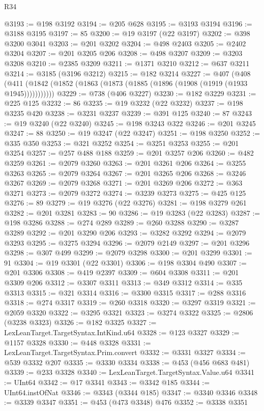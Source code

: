 \begin{lexlean}{R34}
\begin{coremodule}
@3193 := @198 @3192
@3194 := @205 @628
@3195 := @3193 @3194
@3196 := @3188 @3195
@3197 := 85
@3200 := @19 @3197 (@22 @3197)
@3202 := @398 @3200 @3041
@3203 := @201 @3202
@3204 := @498 @2403
@3205 := @2402 @3204
@3207 := @201 @3205 @206
@3208 := @498 @3207
@3209 := @3203 @3208
@3210 := @2385 @3209
@3211 := @1371 @3210
@3212 := @637 @3211
@3214 := @3185 (@3196 @3212)
@3215 := @182 @3214
@3227 := @407
    (@408 (@411 (@1842 (@1852 (@1863 (@1873 (@1885 (@1896 (@1908 (@1919 (@1933 @1945)))))))))))
@3229 := @738 (@406 @3227)
@3230 := @182 @3229
@3231 := @225 @125
@3232 := 86
@3235 := @19 @3232 (@22 @3232)
@3237 := @198 @3235 @420
@3238 := @3231 @3237
@3239 := @391 @125
@3240 := 87
@3243 := @19 @3240 (@22 @3240)
@3245 := @198 @3243 @322
@3246 := @201 @3245
@3247 := 88
@3250 := @19 @3247 (@22 @3247)
@3251 := @198 @3250
@3252 := @335 @350
@3253 := @321 @3252
@3254 := @3251 @3253
@3255 := @201 @3254
@3257 := @257 @488 @188
@3259 := @201 @3257 @206
@3260 := @482 @3259
@3261 := @2079 @3260
@3263 := @201 @3261 @206
@3264 := @3255 @3263
@3265 := @2079 @3264
@3267 := @201 @3265 @206
@3268 := @3246 @3267
@3269 := @2079 @3268
@3271 := @201 @3269 @206
@3272 := @363 @3271
@3273 := @2079 @3272
@3274 := @3239 @3273
@3275 := @425 @125
@3276 := 89
@3279 := @19 @3276 (@22 @3276)
@3281 := @198 @3279 @261
@3282 := @201 @3281
@3283 := 90
@3286 := @19 @3283 (@22 @3283)
@3287 := @198 @3286
@3288 := @274 @289
@3289 := @260 @3288
@3290 := @3287 @3289
@3292 := @201 @3290 @206
@3293 := @3282 @3292
@3294 := @2079 @3293
@3295 := @3275 @3294
@3296 := @2079 @2149
@3297 := @201 @3296
@3298 := @307 @499
@3299 := @2079 @3298
@3300 := @201 @3299
@3301 := 91
@3304 := @19 @3301 (@22 @3301)
@3306 := @198 @3304 @490
@3307 := @201 @3306
@3308 := @419 @2397
@3309 := @604 @3308
@3311 := @201 @3309 @206
@3312 := @3307 @3311
@3313 := @349 @3312
@3314 := @335 @3313
@3315 := @321 @3314
@3316 := @3300 @3315
@3317 := @288 @3316
@3318 := @274 @3317
@3319 := @260 @3318
@3320 := @3297 @3319
@3321 := @2059 @3320
@3322 := @3295 @3321
@3323 := @3274 @3322
@3325 := @2806 (@3238 @3323)
@3326 := @182 @3325
@3327 := LexLeanTarget.TargetSyntax.IntKind.u64
@3328 := @123 @3327
@3329 := @1157 @3328
@3330 := @448 @3328
@3331 := LexLeanTarget.TargetSyntax.Prim.convert
@3332 := @3331 @3327
@3334 := @539 @3332 @207
@3335 := @3330 @3334
@3338 := @453 (@456 @683 @481)
@3339 := @233 @3328
@3340 := LexLeanTarget.TargetSyntax.Value.u64
@3341 := UInt64
@3342 := @17 @3341
@3343 := @3342 @185
@3344 := UInt64.instOfNat
@3346 := @3343 (@3344 @185)
@3347 := @3340 @3346
@3348 := @3339 @3347
@3351 := @453 (@473 @3348) @476
@3352 := @3338 @3351

\end{coremodule}
\end{lexlean}
